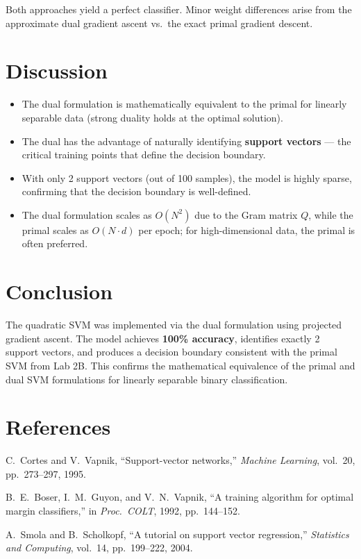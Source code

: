 \documentclass[12pt,a4paper]{article}
\begin{document}
Both approaches yield a perfect classifier. Minor weight differences arise from the approximate dual gradient ascent vs.\ the exact primal gradient descent.

\section{Discussion}

\begin{itemize}
  \item The dual formulation is mathematically equivalent to the primal for linearly separable data (strong duality holds at the optimal solution).
  \item The dual has the advantage of naturally identifying \textbf{support vectors} — the critical training points that define the decision boundary.
  \item With only 2 support vectors (out of 100 samples), the model is highly sparse, confirming that the decision boundary is well-defined.
  \item The dual formulation scales as $O(N^2)$ due to the Gram matrix $Q$, while the primal scales as $O(N \cdot d)$ per epoch; for high-dimensional data, the primal is often preferred.
\end{itemize}

\section{Conclusion}

The quadratic SVM was implemented via the dual formulation using projected gradient ascent. The model achieves \textbf{100\% accuracy}, identifies exactly 2 support vectors, and produces a decision boundary consistent with the primal SVM from Lab 2B. This confirms the mathematical equivalence of the primal and dual SVM formulations for linearly separable binary classification.

\section{References}
\begin{enumerate}[label={[\arabic*]}]
  \item C.\ Cortes and V.\ Vapnik, ``Support-vector networks,'' \textit{Machine Learning}, vol.\ 20, pp.\ 273--297, 1995.
  \item B.\ E.\ Boser, I.\ M.\ Guyon, and V.\ N.\ Vapnik, ``A training algorithm for optimal margin classifiers,'' in \textit{Proc.\ COLT}, 1992, pp.\ 144--152.
  \item A.\ Smola and B.\ Scholkopf, ``A tutorial on support vector regression,'' \textit{Statistics and Computing}, vol.\ 14, pp.\ 199--222, 2004.
\end{enumerate}
\end{document}
